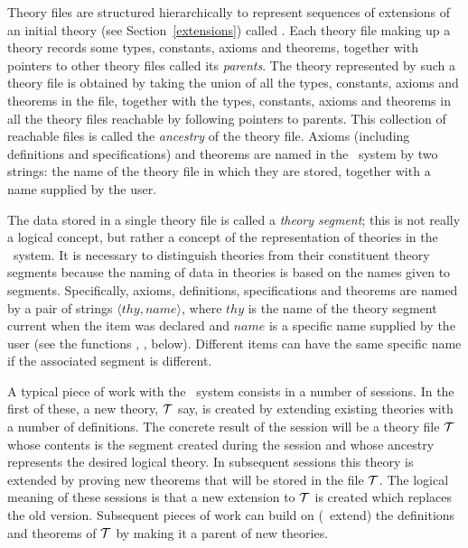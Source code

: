 {Theory files are structured hierarchically to represent sequences of
extensions of an initial theory (see Section~\ref{extensions}) called
. Each theory file making up a theory records some types, constants,
axioms and theorems, together with pointers to other theory files called its
{\it parents\/}.  The theory represented by such a theory file is obtained by
taking the union of all the types, constants, axioms and theorems in the file,
together with the types, constants, axioms and theorems in all the theory
files reachable by following pointers to parents. This collection of reachable
files is called the {\it ancestry\/}
of the theory file. Axioms (including
definitions and specifications) and theorems are named in the \HOL\ system by
two strings: the name of the theory file in which they are stored, together with
a name supplied by the user.

The data stored in a single theory file is called a {\it theory segment\/};
this is not really a logical concept, but rather a concept of the
representation of theories in the \HOL\ system. It is necessary to distinguish
theories from their constituent theory segments  because the naming of data
in theories is based on the names given to segments.  Specifically, axioms,
definitions, specifications and theorems are named
 by a pair of strings
$\langle thy,name \rangle$,
where $thy$ is the name of the theory segment current when the
item was declared and $name$ is a specific name supplied by the user (see the
functions , , below). Different items
can have the same specific name if the associated segment is different.

A typical piece of work with the \HOL\ system consists in a number of
sessions.
In the first of these, a new theory, ${\cal T}$ say, is created by
extending existing theories with a number of definitions. The concrete result
of the session will be a theory file ${\cal T}$ whose contents is the
segment created during the session and whose ancestry represents the desired
logical theory.  In subsequent sessions this theory is extended by proving new
theorems that will be stored in the file ${\cal T}$. The logical
meaning of these sessions is that a new extension to ${\cal T}$ is created
which replaces the old version.  Subsequent pieces of work can build on (\ie\
extend) the definitions and theorems of ${\cal T}$ by making it a parent of
new theories.

}
